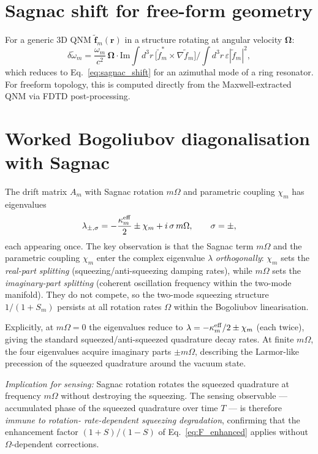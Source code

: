 \documentclass[11pt]{article}
\newcommand{\eff}{{\rm eff}}
\newcommand{\tf}{\tilde{\mathbf{f}}}
\newcommand{\tomega}{\tilde{\omega}}
\begin{document}
\section{Sagnac shift for free-form geometry}
\label{app:sagnac_geo}

For a generic 3D QNM $\tf_m(\mathbf{r})$ in a structure rotating at
angular velocity $\boldsymbol{\Omega}$:
\begin{equation}
  \delta\tomega_m = \frac{\omega_m}{c^2}\,\boldsymbol{\Omega}\cdot
  \mathrm{Im}\!\int d^3r\,\bigl[\tilde f_m^*\times\nabla \tilde f_m\bigr]
  \Big/\! \int d^3r\,\varepsilon|\tilde f_m|^2,
\end{equation}
which reduces to Eq.~\eqref{eq:sagnac_shift} for an azimuthal mode of a
ring resonator.  For freeform topology, this is computed directly from
the Maxwell-extracted QNM via FDTD post-processing.

\section{Worked Bogoliubov diagonalisation with Sagnac}
\label{app:bogo_diag}

The drift matrix $A_m$ with Sagnac rotation $m\Omega$ and parametric
coupling $\chi_m$ has eigenvalues
\begin{equation}
  \lambda_{\pm,\sigma} = -\frac{\kappa^\eff_m}{2} \pm \chi_m
    + i\,\sigma\,m\Omega,\qquad \sigma=\pm,
  \label{eq:bogo_eigenvalues}
\end{equation}
each appearing once.  The key observation is that the Sagnac term
$m\Omega$ and the parametric coupling $\chi_m$ enter the complex
eigenvalue $\lambda$ \emph{orthogonally}: $\chi_m$ sets the
\emph{real-part splitting} (squeezing/anti-squeezing damping rates),
while $m\Omega$ sets the \emph{imaginary-part splitting} (coherent
oscillation frequency within the two-mode manifold).  They do not
compete, so the two-mode squeezing structure $1/(1+S_m)$ persists at
all rotation rates $\Omega$ within the Bogoliubov linearisation.

Explicitly, at $m\Omega=0$ the eigenvalues reduce to
$\lambda = -\kappa^\eff_m/2 \pm \chi_m$ (each twice), giving the
standard squeezed/anti-squeezed quadrature decay rates.  At finite
$m\Omega$, the four eigenvalues acquire imaginary parts $\pm m\Omega$,
describing the Larmor-like precession of the squeezed quadrature
around the vacuum state.

\emph{Implication for sensing:} Sagnac rotation rotates the squeezed
quadrature at frequency $m\Omega$ without destroying the squeezing.
The sensing observable --- accumulated phase of the squeezed
quadrature over time $T$ --- is therefore \emph{immune to rotation-
rate-dependent squeezing degradation}, confirming that the
enhancement factor $(1+S)/(1-S)$ of Eq.~\eqref{eq:F_enhanced} applies
without $\Omega$-dependent corrections.
\end{document}
